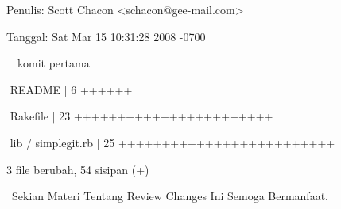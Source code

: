\noindent 
 \hspace*{0.5in} Penulis: Scott Chacon <schacon@gee-mail.com> \par
\noindent 
 \hspace*{0.5in} Tanggal: Sat Mar 15 10:31:28 2008 -0700 \par
\noindent 
 \hspace*{0.5in}  $  $ $  $ $  $ $  $komit pertama \par
\noindent 
 $  $ \hspace*{0.5in}  \hspace*{0.5in} README  $  \vert  $ 6 ++++++ \par
\noindent 
 \hspace*{0.5in}  $  $ \hspace*{0.5in} Rakefile  $  \vert  $ 23 +++++++++++++++++++++++ \par
\noindent 
 $  $ \hspace*{0.5in}  \hspace*{0.5in} lib / simplegit.rb  $  \vert  $ 25 +++++++++++++++++++++++++ \par
\noindent 
 \hspace*{0.5in}  \hspace*{0.5in}  $  $3 file berubah, 54 sisipan (+) \par
 \noindent
 \ Sekian Materi Tentang Review Changes Ini Semoga Bermanfaat. \par 

